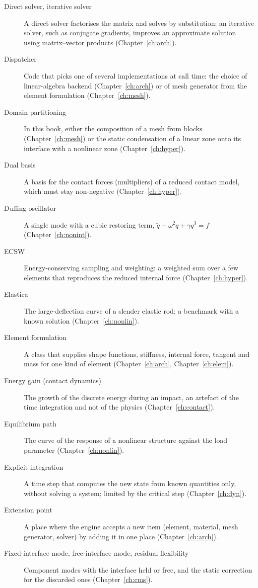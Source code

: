 \begin{description}
\item[Direct solver, iterative solver] A direct solver factorises the matrix and solves by substitution; an iterative solver, such as conjugate gradients, improves an approximate solution using matrix--vector products (Chapter~\ref{ch:arch}).
\item[Dispatcher] Code that picks one of several implementations at call time: the choice of linear-algebra backend (Chapter~\ref{ch:arch}) or of mesh generator from the element formulation (Chapter~\ref{ch:mesh}).
\item[Domain partitioning] In this book, either the composition of a mesh from blocks (Chapter~\ref{ch:mesh}) or the static condensation of a linear zone onto its interface with a nonlinear zone (Chapter~\ref{ch:hyper}).
\item[Dual basis] A basis for the contact forces (multipliers) of a reduced contact model, which must stay non-negative (Chapter~\ref{ch:hyper}).
\item[Duffing oscillator] A single mode with a cubic restoring term, $\ddot q+\omega^2q+\gamma q^3=f$ (Chapter~\ref{ch:nonint}).
\item[ECSW] Energy-conserving sampling and weighting: a weighted sum over a few elements that reproduces the reduced internal force (Chapter~\ref{ch:hyper}).
\item[Elastica] The large-deflection curve of a slender elastic rod; a benchmark with a known solution (Chapter~\ref{ch:nonlin}).
\item[Element formulation] A class that supplies shape functions, stiffness, internal force, tangent and mass for one kind of element (Chapter~\ref{ch:arch}, Chapter~\ref{ch:elem}).
\item[Energy gain (contact dynamics)] The growth of the discrete energy during an impact, an artefact of the time integration and not of the physics (Chapter~\ref{ch:contact}).
\item[Equilibrium path] The curve of the response of a nonlinear structure against the load parameter (Chapter~\ref{ch:nonlin}).
\item[Explicit integration] A time step that computes the new state from known quantities only, without solving a system; limited by the critical step (Chapter~\ref{ch:dyn}).
\item[Extension point] A place where the engine accepts a new item (element, material, mesh generator, solver) by adding it in one place (Chapter~\ref{ch:arch}).
\item[Fixed-interface mode, free-interface mode, residual flexibility] Component modes with the interface held or free, and the static correction for the discarded ones (Chapter~\ref{ch:cms}).

\end{description}
